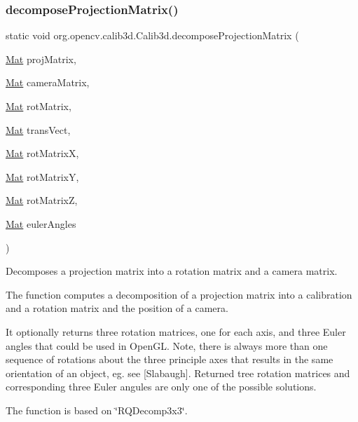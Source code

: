 \subsubsection{\texorpdfstring{decompose\+Projection\+Matrix()}{decomposeProjectionMatrix()}\hspace{0.1cm}{\footnotesize\ttfamily [1/2]}}
{\footnotesize\ttfamily static void org.\+opencv.\+calib3d.\+Calib3d.\+decompose\+Projection\+Matrix (\begin{DoxyParamCaption}\item[{\mbox{\hyperlink{classorg_1_1opencv_1_1core_1_1_mat}{Mat}}}]{proj\+Matrix,  }\item[{\mbox{\hyperlink{classorg_1_1opencv_1_1core_1_1_mat}{Mat}}}]{camera\+Matrix,  }\item[{\mbox{\hyperlink{classorg_1_1opencv_1_1core_1_1_mat}{Mat}}}]{rot\+Matrix,  }\item[{\mbox{\hyperlink{classorg_1_1opencv_1_1core_1_1_mat}{Mat}}}]{trans\+Vect,  }\item[{\mbox{\hyperlink{classorg_1_1opencv_1_1core_1_1_mat}{Mat}}}]{rot\+MatrixX,  }\item[{\mbox{\hyperlink{classorg_1_1opencv_1_1core_1_1_mat}{Mat}}}]{rot\+MatrixY,  }\item[{\mbox{\hyperlink{classorg_1_1opencv_1_1core_1_1_mat}{Mat}}}]{rot\+MatrixZ,  }\item[{\mbox{\hyperlink{classorg_1_1opencv_1_1core_1_1_mat}{Mat}}}]{euler\+Angles }\end{DoxyParamCaption})\hspace{0.3cm}{\ttfamily [static]}}

Decomposes a projection matrix into a rotation matrix and a camera matrix.

The function computes a decomposition of a projection matrix into a calibration and a rotation matrix and the position of a camera.

It optionally returns three rotation matrices, one for each axis, and three Euler angles that could be used in Open\+GL. Note, there is always more than one sequence of rotations about the three principle axes that results in the same orientation of an object, eg. see \mbox{[}Slabaugh\mbox{]}. Returned tree rotation matrices and corresponding three Euler angules are only one of the possible solutions.

The function is based on \char`\"{}\+R\+Q\+Decomp3x3\char`\"{}.


